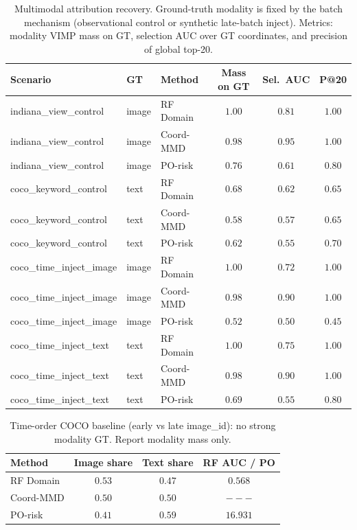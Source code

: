 
\begin{table}[ht]
\centering
\caption{Multimodal attribution recovery. Ground-truth modality is fixed by the batch mechanism (observational control or synthetic late-batch inject). Metrics: modality VIMP mass on GT, selection AUC over GT coordinates, and precision of global top-20.}
\label{tab:mm-attr-eval-recovery}
\small
\begin{tabular}{@{}l l l c c c@{}}
\toprule
Scenario & GT & Method & Mass on GT & Sel.\ AUC & P@20 \\
\midrule
indiana_view_control & image & RF Domain & $1.00$ & $0.81$ & $1.00$ \\
indiana_view_control & image & Coord-MMD & $0.98$ & $0.95$ & $1.00$ \\
indiana_view_control & image & PO-risk & $0.76$ & $0.61$ & $0.80$ \\
coco_keyword_control & text & RF Domain & $0.68$ & $0.62$ & $0.65$ \\
coco_keyword_control & text & Coord-MMD & $0.58$ & $0.57$ & $0.65$ \\
coco_keyword_control & text & PO-risk & $0.62$ & $0.55$ & $0.70$ \\
coco_time_inject_image & image & RF Domain & $1.00$ & $0.72$ & $1.00$ \\
coco_time_inject_image & image & Coord-MMD & $0.98$ & $0.90$ & $1.00$ \\
coco_time_inject_image & image & PO-risk & $0.52$ & $0.50$ & $0.45$ \\
coco_time_inject_text & text & RF Domain & $1.00$ & $0.75$ & $1.00$ \\
coco_time_inject_text & text & Coord-MMD & $0.98$ & $0.90$ & $1.00$ \\
coco_time_inject_text & text & PO-risk & $0.69$ & $0.55$ & $0.80$ \\
\bottomrule
\end{tabular}
\end{table}

\begin{table}[ht]
\centering
\caption{Time-order COCO baseline (early vs late image\_id): no strong modality GT. Report modality mass only.}
\label{tab:mm-attr-eval-time-baseline}
\small
\begin{tabular}{@{}l cc c@{}}
\toprule
Method & Image share & Text share & RF AUC / PO \\
\midrule
RF Domain & $0.53$ & $0.47$ & $0.568$ \\
Coord-MMD & $0.50$ & $0.50$ & $---$ \\
PO-risk & $0.41$ & $0.59$ & $16.931$ \\
\bottomrule
\end{tabular}
\end{table}
